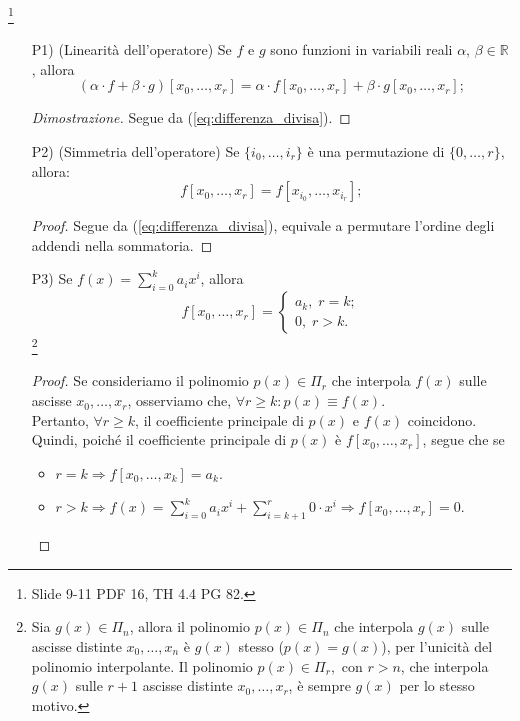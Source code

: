 \begin{property}
	\footnote{Slide 9-11 PDF 16, TH 4.4 PG 82.}
	\begin{itemize}
		\item[P1)](Linearità dell'operatore) Se $f$ e $g$ sono funzioni in variabili reali $\alpha,\,\beta \in\mathbb R$, allora
		\begin{equation*}
			(\alpha\cdot f + \beta\cdot g)[x_0,\hdots, x_r]=\alpha\cdot f[x_0,\hdots, x_r]+\beta\cdot g[x_0,\hdots, x_r];
		\end{equation*}
		\begin{proof}[Dimostrazione] 
			Segue da (\ref{eq:differenza_divisa}).
		\end{proof}
		
		\item[P2)](Simmetria dell'operatore) Se $\{i_0,\hdots,i_r\}$ è una permutazione di $\{0,\hdots, r\}$, allora:
		\begin{equation*}
			f[x_0,\hdots,x_r]=f[x_{i_0},\hdots,x_{i_r}];
		\end{equation*}
		\begin{proof}
			Segue da (\ref{eq:differenza_divisa}), equivale a permutare l'ordine degli addendi nella sommatoria.
		\end{proof}
		
		\item[P3)] Se $f(x)=\sum_{i=0}^ka_ix^i$, allora 
		\begin{equation*}
					f[x_0,\hdots, x_r]=
				\begin{cases}
					a_k,\; r=k;\\
					0,\; r>k.
				\end{cases}
		\end{equation*}
		\footnote{Sia $g(x)\in\Pi_n$, allora il polinomio $p(x)\in\Pi_n$ che interpola $g(x)$ sulle ascisse distinte $x_0,\hdots,x_n$ è $g(x)$ stesso ($p(x)=g(x)$), per l'unicità del polinomio interpolante.
			Il polinomio $p(x)\in\Pi_r,$ con $r>n$, che interpola $g(x)$ sulle $r+1$ ascisse distinte $x_0, \hdots, x_r$, è sempre $g(x)$ per lo stesso motivo.}
		\begin{proof}
			Se consideriamo il polinomio $p(x)\in \Pi_r$ che interpola $f(x)$ sulle ascisse $x_0, \hdots, x_r$, osserviamo che, $\forall r \geq k : p(x)\equiv f(x)$.\\
			Pertanto, $\forall r \geq k$, il coefficiente principale di $p(x)$ e $f(x)$ coincidono. Quindi, poiché il coefficiente principale di $p(x)$ è $f[x_0, \hdots, x_r]$, segue che se
			\begin{itemize}
				\item $r = k \Rightarrow f[x_0, \hdots, x_k] = a_k.$
				\item $r > k \Rightarrow f(x) = \sum_{i=0}^{k} a_i x^i + \sum_{i = k+1}^r 0 \cdot x^i \Rightarrow f[x_0, \hdots, x_r] = 0.$
			\end{itemize}
		\end{proof}
		

\end{itemize}
\end{property}
